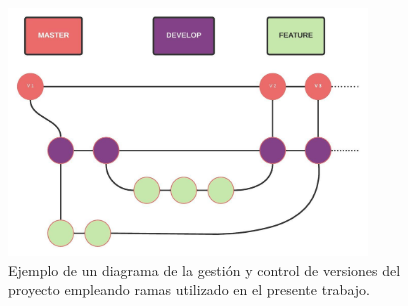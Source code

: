  \begin{figure}[htbp]
 	\centering
 	\includegraphics[width=0.85\textwidth]{figs/cap3/ejemplo_ramas}
 	\caption{Ejemplo de un diagrama de la gestión y control de versiones del proyecto empleando ramas utilizado en el presente trabajo.}
 	\label{fig:ramas}	
 \end{figure}
 
 








